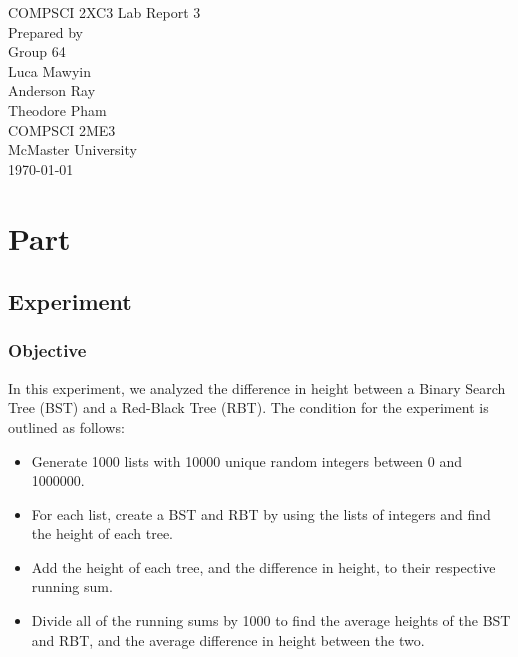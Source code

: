 \documentclass[letterpaper]{article}
\theoremstyle{plain}
\theoremstyle{definition}
\theoremstyle{remark}
\newcounter{experiment}
\begin{document}
\begin{titlepage}

	\thispagestyle{empty}
	\centering
	\vspace*{3em}

	\Huge{COMPSCI 2XC3 Lab Report 3}\\[1em]
	\Large Prepared by\\[2em]
	\Large Group 64\\[2em]

	\LARGE Luca Mawyin\\[0.5em]
	\LARGE Anderson Ray\\[0.5em]
	\LARGE Theodore Pham\\[2em]

	\Large COMPSCI 2ME3 \\[0.5em]
	\Large McMaster University\\[2em]
	\Large \today\\[2cm]

\end{titlepage}

\tableofcontents
\newpage

\listoffigures
\newpage

\listoftables
\newpage


\section*{Part \thesection}

\subsection*{Experiment \theexperiment}
\label{exp1}

\subsubsection*{Objective}
In this experiment, we analyzed the difference in height between a Binary Search Tree (BST) and a Red-Black Tree (RBT). The condition for the experiment is outlined as follows:

\begin{itemize}
    \item Generate 1000 lists with 10000 unique random integers between 0 and 1000000.
    \item For each list, create a BST and RBT by using the lists of integers and find the height of each tree.
    \item Add the height of each tree, and the difference in height, to their respective running sum.
    \item Divide all of the running sums by 1000 to find the average heights of the BST and RBT, and the average difference in height between the two.
\end{itemize}
\end{document}
